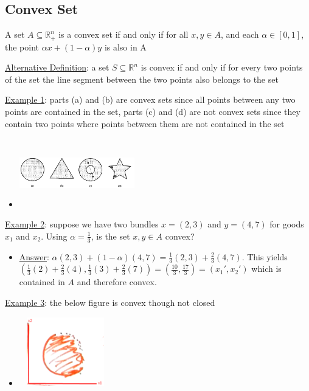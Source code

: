 \documentclass{article}
\begin{document}
\subsection{Convex Set}
A set $A \subseteq \mathbb{R}_{+}^{n}$ is a convex set if and only if for all $x, y \in A$, and each $\alpha \in [0,1]$, the point $\alpha x + (1- \alpha)y$ is also in A \par \vspace{0.3em}
  \underline{Alternative Definition}: a set $S \subseteq \mathbb{R}^{n}$ is convex if and only if for every two points of the set the line segment between the two points also belongs to the set
  \par
  \underline{Example 1}: parts (a) and (b) are convex sets since all points between any two points are contained in the set, parts (c) and (d) are not convex sets since they contain two points where points between them are not contained in the set
  \begin{itemize}
    \item  \includegraphics[width=5cm, height=3cm]{pic8}
  \end{itemize}
  \par
  \underline{Example 2}: suppose we have two bundles $x = (2,3)$ and $y = (4,7)$ for goods $x_{1}$ and $x_{2}$. Using $\alpha = \tfrac{1}{3}$, is the set $x, y \in A$ convex?
  \begin{itemize}
    \item  \underline{Answer}: $\alpha (2,3) + (1- \alpha)(4,7) = \tfrac{1}{3}(2,3) + \tfrac{2}{3}(4,7)$. This yields $(\tfrac{1}{3}(2) + \tfrac{2}{3}(4), \tfrac{1}{3}(3) + \tfrac{2}{3}(7)) = (\tfrac{10}{3}, \tfrac{17}{3}) = (x_{1}', x_{2}')$ which is contained in $A$ and therefore convex.
  \end{itemize}
  \par
  \underline{Example 3}: the below figure is convex though not closed
  \begin{itemize}
    \item  \includegraphics[width=4cm, height=3cm]{pic14}
  \end{itemize}
\end{document}
